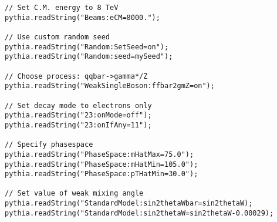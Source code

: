\lstset{language=C++}
\begin{small}
\begin{lstlisting}[frame=single]
// Set C.M. energy to 8 TeV
pythia.readString("Beams:eCM=8000.");

// Use custom random seed
pythia.readString("Random:SetSeed=on");
pythia.readString("Random:seed=mySeed");

// Choose process: qqbar->gamma*/Z
pythia.readString("WeakSingleBoson:ffbar2gmZ=on");

// Set decay mode to electrons only
pythia.readString("23:onMode=off");
pythia.readString("23:onIfAny=11");

// Specify phasespace
pythia.readString("PhaseSpace:mHatMax=75.0");
pythia.readString("PhaseSpace:mHatMin=105.0");
pythia.readString("PhaseSpace:pTHatMin=30.0");

// Set value of weak mixing angle
pythia.readString("StandardModel:sin2thetaWbar=sin2thetaW);
pythia.readString("StandardModel:sin2thetaW=sin2thetaW-0.00029);
\end{lstlisting}
\end{small}
